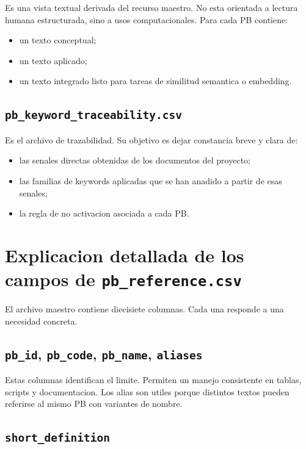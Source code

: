 \documentclass[11pt,a4paper]{article}
\begin{document}
Es una vista textual derivada del recurso maestro. No esta orientada a lectura humana estructurada, sino a usos computacionales. Para cada PB contiene:

\begin{itemize}
\item un texto conceptual;
\item un texto aplicado;
\item un texto integrado listo para tareas de similitud semantica o embedding.
\end{itemize}

\subsection{\texttt{pb\_keyword\_traceability.csv}}

Es el archivo de trazabilidad. Su objetivo es dejar constancia breve y clara de:

\begin{itemize}
\item las senales directas obtenidas de los documentos del proyecto;
\item las familias de keywords aplicadas que se han anadido a partir de esas senales;
\item la regla de no activacion asociada a cada PB.
\end{itemize}

\section{Explicacion detallada de los campos de \texttt{pb\_reference.csv}}

El archivo maestro contiene diecisiete columnas. Cada una responde a una necesidad concreta.

\subsection{\texttt{pb\_id}, \texttt{pb\_code}, \texttt{pb\_name}, \texttt{aliases}}

Estas columnas identifican el limite. Permiten un manejo consistente en tablas, scripts y documentacion. Los alias son utiles porque distintos textos pueden referirse al mismo PB con variantes de nombre.

\subsection{\texttt{short\_definition}}
\end{document}
